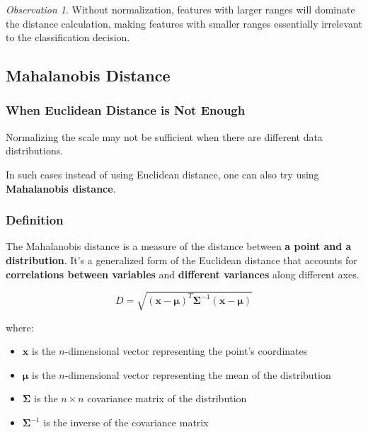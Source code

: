 \documentclass[11pt,a4paper]{article}
\theoremstyle{definition}
\theoremstyle{plain}
\theoremstyle{remark}
\newtheorem*{observation}{Observation}
\begin{document}
\begin{observation}
Without normalization, features with larger ranges will dominate the distance calculation, making features with smaller ranges essentially irrelevant to the classification decision.
\end{observation}

\subsection{Mahalanobis Distance}

\subsubsection{When Euclidean Distance is Not Enough}

Normalizing the scale may not be sufficient when there are different data distributions.

\begin{center}
\colorbox{orange!15}{\parbox{0.9\textwidth}{
In such cases instead of using Euclidean distance, one can also try using \textbf{Mahalanobis distance}.
}}
\end{center}

\subsubsection{Definition}

The Mahalanobis distance is a measure of the distance between \textbf{a point and a distribution}. It's a generalized form of the Euclidean distance that accounts for \textbf{correlations between variables} and \textbf{different variances} along different axes.

\begin{tcolorbox}[colback=purple!5!white,colframe=purple!75!black,title=\textbf{Mahalanobis Distance Formula}]
\[
D = \sqrt{(\mathbf{x} - \boldsymbol{\mu})^T \boldsymbol{\Sigma}^{-1} (\mathbf{x} - \boldsymbol{\mu})}
\]

where:
\begin{itemize}
    \item $\mathbf{x}$ is the $n$-dimensional vector representing the point's coordinates
    \item $\boldsymbol{\mu}$ is the $n$-dimensional vector representing the mean of the distribution
    \item $\boldsymbol{\Sigma}$ is the $n \times n$ covariance matrix of the distribution
    \item $\boldsymbol{\Sigma}^{-1}$ is the inverse of the covariance matrix
\end{itemize}
\end{tcolorbox}
\end{document}
